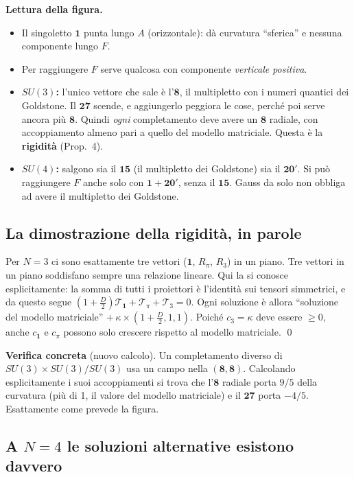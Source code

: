 \documentclass[11pt,a4paper]{article}
\numberwithin{equation}{section}
\theoremstyle{remark}
\begin{document}
\textbf{Lettura della figura.}
\begin{itemize}
\item Il singoletto $\mathbf1$ punta lungo $A$ (orizzontale): dà curvatura ``sferica'' e nessuna componente lungo $F$.
\item Per raggiungere $F$ serve qualcosa con componente \emph{verticale positiva}.
\item \textbf{$SU(3)$:} l'unico vettore che sale è l'$\mathbf8$, il multipletto con i numeri quantici dei Goldstone. Il $\mathbf{27}$ scende, e aggiungerlo peggiora le cose, perché poi serve ancora più $\mathbf8$. Quindi \emph{ogni} completamento deve avere un $\mathbf8$ radiale, con accoppiamento almeno pari a quello del modello matriciale. Questa è la \textbf{rigidità} (Prop.~4).
\item \textbf{$SU(4)$:} salgono sia il $\mathbf{15}$ (il multipletto dei Goldstone) sia il $\mathbf{20}'$. Si può raggiungere $F$ anche solo con $\mathbf1+\mathbf{20}'$, senza il $\mathbf{15}$. Gauss da solo non obbliga ad avere il multipletto dei Goldstone.
\end{itemize}

\subsection{La dimostrazione della rigidità, in parole}

Per $N=3$ ci sono esattamente tre vettori ($\mathbf1$, $R_\pi$, $R_3$) in un piano. Tre vettori in un piano soddisfano sempre una relazione lineare. Qui la si conosce esplicitamente: la somma di tutti i proiettori è l'identità sui tensori simmetrici, e da questo segue $(1+\frac D2)\mathcal T_{\mathbf1}+\mathcal T_\pi+\mathcal T_3=0$. Ogni soluzione è allora ``soluzione del modello matriciale'' $+\,\kappa\times(1+\frac D2,1,1)$. Poiché $c_3=\kappa$ deve essere $\ge0$, anche $c_{\mathbf1}$ e $c_\pi$ possono solo crescere rispetto al modello matriciale. \qed

\textbf{Verifica concreta} (nuovo calcolo). Un completamento diverso di $SU(3)\times SU(3)/SU(3)$ usa un campo nella $(\mathbf8,\mathbf8)$. Calcolando esplicitamente i suoi accoppiamenti si trova che l'$\mathbf8$ radiale porta $9/5$ della curvatura (più di 1, il valore del modello matriciale) e il $\mathbf{27}$ porta $-4/5$. Esattamente come prevede la figura.

\subsection{A $N=4$ le soluzioni alternative esistono davvero}
\end{document}
